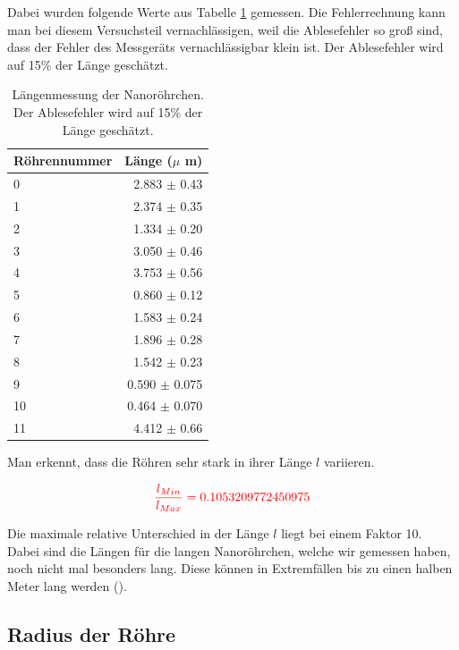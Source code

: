 Dabei wurden folgende Werte aus Tabelle \ref{TabLaenge} gemessen. Die Fehlerrechnung kann man bei diesem 
Versuchsteil vernachlässigen, weil die Ablesefehler so groß sind, dass der Fehler des Messgeräts vernachlässigbar klein ist. Der Ablesefehler wird auf 15\% der Länge geschätzt. \\

\begin{table}
    \centering
    \begin{tabular}{lr}
        \toprule
        Röhrennummer &   Länge ($\mu$ m) \\
        \midrule
        0  &  2.883 $\pm$ 0.43 \\
        1  &  2.374 $\pm$ 0.35\\
        2  &  1.334 $\pm$ 0.20 \\
        3  &  3.050 $\pm$ 0.46 \\
        4  &  3.753 $\pm$ 0.56 \\
        5  &   0.860 $\pm$ 0.12\\
        6  &  1.583 $\pm$ 0.24 \\
        7  &  1.896 $\pm$ 0.28 \\
        8  &  1.542 $\pm$ 0.23 \\
        9  &   0.590 $\pm$ 0.075 \\
        10 &   0.464 $\pm$ 0.070 \\
        11 &  4.412 $\pm$ 0.66\\
        \bottomrule
    \end{tabular}
    \caption{Längenmessung der Nanoröhrchen. Der Ablesefehler wird auf 15\% der Länge geschätzt. \\
    }
    \label{TabLaenge}
\end{table}

Man erkennt, dass die Röhren sehr stark in ihrer Länge $l$  variieren.

\begin{equation}
    \textcolor{red}{\frac{l_{Min}}{l_{Max}} = 0.1053209772450975}
\end{equation}

Die maximale relative Unterschied in der Länge $l$ liegt bei einem Faktor 10. Dabei sind die Längen für die langen 
Nanoröhrchen, welche wir gemessen haben, noch nicht mal besonders lang. Diese können in Extremfällen bis zu
einen halben Meter lang werden (\cite{Dagani2002}).

\subsection*{Radius der Röhre}

